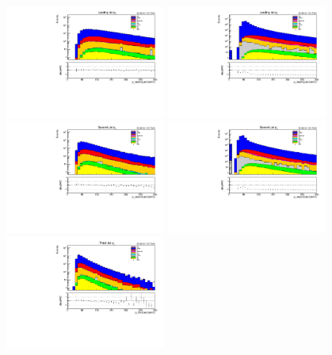 \begin{figure}[tbp]
\centering
\includegraphics[width=0.47\textwidth]{figs/background-estimation/plots/unblinded/DY_control_old_prompt_ee_ttbarInc/leadingJetPt_jetSel.pdf}
\includegraphics[width=0.47\textwidth]{figs/background-estimation/plots/unblinded/DY_control_old_prompt_ee_DYamcatnlo_noSF/leadingJetPt_jetSel.pdf}
\\
\includegraphics[width=0.47\textwidth]{figs/background-estimation/plots/unblinded/DY_control_old_prompt_ee_ttbarInc/secondJetPt_jetSel.pdf}
\includegraphics[width=0.47\textwidth]{figs/background-estimation/plots/unblinded/DY_control_old_prompt_ee_DYamcatnlo_noSF/secondJetPt_jetSel.pdf}
\\
\includegraphics[width=0.47\textwidth]{figs/background-estimation/plots/unblinded/DY_control_old_prompt_ee_ttbarInc/thirdJetPt_jetSel.pdf}

\end{figure}
